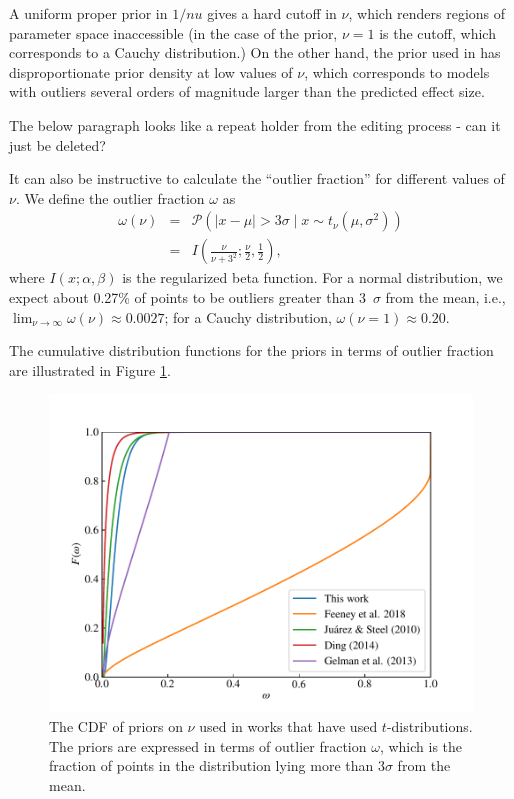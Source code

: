 \documentclass[fleqn,usenatbib]{rasti}
\begin{document}
A uniform proper prior in $1/nu$ gives a hard cutoff in $\nu$, which
renders regions of parameter space inaccessible (in the case of the
\citet{Gelman:2013} prior, $\nu = 1$ is the cutoff, which corresponds to a
Cauchy distribution.) On the other hand, the prior used in \citet{Feeney:2018}
has disproportionate prior density at low values of $\nu$, which corresponds to
models with outliers several orders of magnitude larger than the predicted
effect size.

{\color{green} The below paragraph looks like a repeat holder from the editing process - can it just be deleted?}

It can also be instructive to calculate the ``outlier fraction'' for different
values of $\nu$. We define the outlier fraction $\omega$ as
\begin{eqnarray}
    \omega(\nu) &=& \mathcal P\left(|x - \mu| > 3 \sigma \mid x \sim t_\nu (\mu, \sigma^2) \right) \\
    &=& I\left(\frac{\nu}{\nu + 3^2};\frac\nu2, \frac12\right),
\end{eqnarray}
where $I(x; \alpha, \beta)$ is the regularized beta function. For a normal
distribution, we expect about 0.27\% of points to be outliers greater than
3~$\sigma$ from the mean, i.e., $\lim_{\nu \rightarrow \infty}\omega(\nu)
\approx 0.0027$; for a Cauchy distribution, $\omega(\nu = 1) \approx 0.20$.

The cumulative distribution functions for the priors in terms of outlier
fraction are illustrated in Figure \ref{fig:priors.outlier_frac}.
\begin{figure}
	\includegraphics[width=\columnwidth]{graphics/cdf_outlier_frac}
    \caption{The CDF of priors on $\nu$ used in works that have used
    $t$-distributions. The priors are expressed in terms of outlier fraction
    $\omega$, which is the fraction of points in the distribution lying more
    than 3$\sigma$ from the mean.}
    \label{fig:priors.outlier_frac}
\end{figure}
\end{document}
